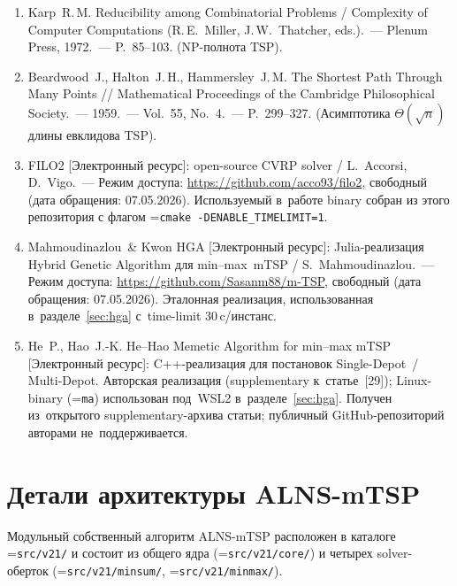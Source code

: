 \documentclass[a4paper,14pt]{extreport}
\makeatletter
\renewcommand{\thechapter}{\arabic{chapter}}
\let\old@texttt\texttt
\renewcommand{\texttt}[1]{{\sloppy\hyphenchar\font=\m@ne\old@texttt{#1}}}
\makeatother
\begin{document}
\begin{enumerate}
\item Karp~R.\,M. Reducibility among Combinatorial Problems / Complexity of Computer Computations (R.\,E.~Miller, J.\,W.~Thatcher, eds.).~--- Plenum Press, 1972.~--- P.~85--103. (NP-полнота TSP).

\item Beardwood~J., Halton~J.\,H., Hammersley~J.\,M. The Shortest Path Through Many Points // Mathematical Proceedings of the Cambridge Philosophical Society.~--- 1959.~--- Vol.~55, No.~4.~--- P.~299--327. (Асимптотика $\Theta(\sqrt{n})$ длины евклидова TSP).

\item FILO2 [Электронный ресурс]: open-source CVRP solver / L.~Accorsi, D.~Vigo.~--- Режим доступа: \url{https://github.com/acco93/filo2}, свободный (дата обращения: 07.05.2026). Используемый в~работе binary собран из этого репозитория с флагом \texttt{cmake -DENABLE\_TIMELIMIT=1}.

\item Mahmoudinazlou~\& Kwon HGA [Электронный ресурс]: Julia-реализация Hybrid Genetic Algorithm для min--max~mTSP / S.~Mahmoudinazlou.~--- Режим доступа: \url{https://github.com/Sasanm88/m-TSP}, свободный (дата обращения: 07.05.2026). Эталонная реализация, использованная в~разделе~\ref{sec:hga} с~time-limit 30\,c/инстанс.

\item He~P., Hao~J.-K. He--Hao Memetic Algorithm for min--max mTSP [Электронный ресурс]: C++-реализация для постановок Single-Depot~/ Multi-Depot. Авторская реализация (supplementary к~статье~[29]); Linux-binary (\texttt{ma}) использован под~WSL2 в~разделе~\ref{sec:hga}. Получен из~открытого supplementary-архива статьи; публичный GitHub-репозиторий авторами не~поддерживается.
\end{enumerate}

\appendix
\renewcommand{\thechapter}{\Asbuk{chapter}}

\chapter{Детали архитектуры ALNS-mTSP}

Модульный собственный алгоритм ALNS-mTSP расположен в каталоге \texttt{src/v21/} и состоит из общего ядра (\texttt{src/v21/core/}) и четырех solver-оберток (\texttt{src/v21/minsum/}, \texttt{src/v21/minmax/}).
\end{document}

